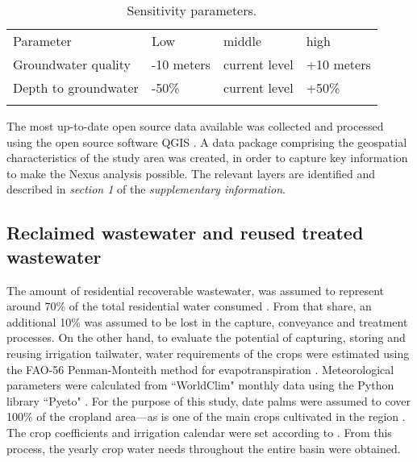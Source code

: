 \begin{table}[!ht]
	\caption{\label{tbl:sensitivy}Sensitivity parameters.}
	\begin{indented}
	\item[]\begin{tabular}{@{}l l l l}
		\br
		Parameter & Low & middle & high\\
		\mr
		Groundwater quality & -10 meters & current level & +10 meters\\
		Depth to groundwater & -50\% & current level & +50\%\\
		\br
	\end{tabular}
	\end{indented}
\end{table}

The most up-to-date open source data available was collected and processed using the open source software QGIS \cite{QGIS2020}. A data package comprising the geospatial characteristics of the study area was created, in order to capture key information to make the Nexus analysis possible. The relevant layers are identified and described in \textit{section 1} of the \textit{supplementary information}.

\subsection{Reclaimed wastewater and reused treated wastewater}
The amount of residential recoverable wastewater, was assumed to represent around 70\% of the total residential water consumed \cite{unescoWastewaterUntappedResource2017}. From that share, an additional 10\% was assumed to be lost in the capture, conveyance and treatment processes.
On the other hand, to evaluate the potential of capturing, storing and reusing irrigation tailwater, water requirements of the crops were estimated using the FAO-56 Penman-Monteith method for evapotranspiration \cite{allenFAOIrrigationDrainage1998}. Meteorological parameters were calculated from ``WorldClim" monthly data \cite{WorldClimGlobalClimate}  using the Python library ``Pyeto" \cite{pyeto}. For the purpose of this study, date palms were assumed to cover 100\% of the cropland area---as is one of the main crops cultivated in the region \cite{almullaNWSAS}. The crop coefficients and irrigation calendar were set according to \citet{almullaNWSAS}. From this process, the yearly crop water needs throughout the entire basin were obtained.

